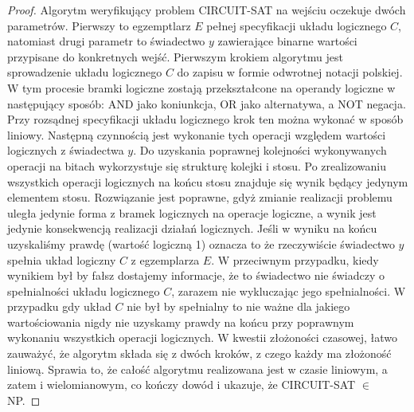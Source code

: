 \begin{proof}
Algorytm weryfikujący problem CIRCUIT-SAT na wejściu oczekuje dwóch parametrów. Pierwszy to egzemptlarz $E$ pełnej specyfikacji układu logicznego $C$, natomiast drugi parametr to świadectwo $y$ zawierające binarne wartości przypisane do konkretnych wejść. Pierwszym krokiem algorytmu jest sprowadzenie układu logicznego $C$ do zapisu w formie odwrotnej notacji polskiej. W tym procesie bramki logiczne zostają przekształcone na operandy logiczne w następujący sposób: AND jako koniunkcja, OR jako alternatywa, a NOT negacja. Przy rozsądnej specyfikacji układu logicznego krok ten można wykonać w sposób liniowy. Następną czynnością jest wykonanie tych operacji względem wartości logicznych z świadectwa $y$. Do uzyskania poprawnej kolejności wykonywanych operacji na bitach wykorzystuje się strukturę kolejki i stosu. Po zrealizowaniu wszystkich operacji logicznych na końcu stosu znajduje się wynik będący jedynym elementem stosu. Rozwiązanie jest poprawne, gdyż zmianie realizacji problemu uległa jedynie forma z bramek logicznych na operacje logiczne, a wynik jest jedynie konsekwencją realizacji działań logicznych. Jeśli w wyniku na końcu uzyskaliśmy prawdę (wartość logiczną 1) oznacza to że rzeczywiście świadectwo $y$ spełnia układ logiczny $C$ z egzemplarza $E$. W przeciwnym przypadku, kiedy wynikiem był by fałsz dostajemy informacje, że to świadectwo nie świadczy o spełnialności układu logicznego $C$, zarazem nie wykluczając jego spełnialności. W przypadku gdy układ $C$ nie był by spełnialny to nie ważne dla jakiego wartościowania nigdy nie uzyskamy prawdy na końcu przy poprawnym wykonaniu wszystkich operacji logicznych. W kwestii złożoności czasowej, łatwo zauważyć, że algorytm składa się z dwóch kroków, z czego każdy ma złożoność liniową. Sprawia to, że całość algorytmu realizowana jest w czasie liniowym, a zatem i wielomianowym, co kończy dowód i ukazuje, że CIRCUIT-SAT $\in$ NP.
\end{proof}

